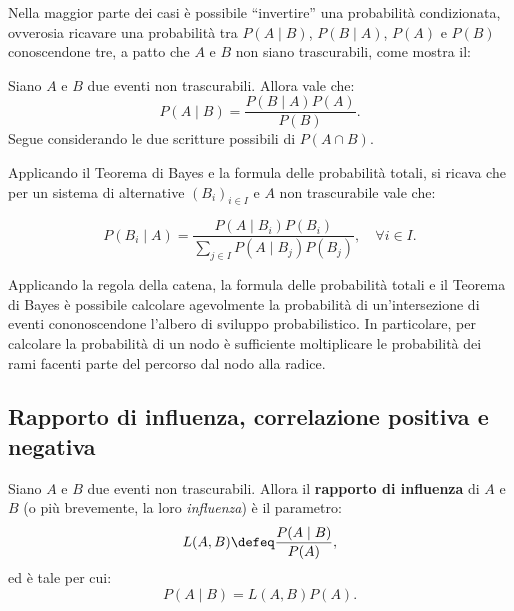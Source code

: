 \begin{multicols*}{2}
    Nella maggior parte dei casi è possibile ``invertire'' una probabilità
    condizionata, ovverosia ricavare una probabilità tra $P(A \mid B)$,
    $P(B \mid A)$, $P(A)$ e $P(B)$ conoscendone tre, a patto che
    $A$ e $B$ non siano trascurabili, come mostra il:

    \begin{theorem}[di Bayes]
        Siano $A$ e $B$ due eventi non trascurabili. Allora vale che:
        \[
            P(A \mid B) = \frac{P(B \mid A) P(A)}{P(B)}.
        \]
        Segue considerando le due scritture possibili di $P(A \cap B)$.
    \end{theorem}

    \begin{remark}
        Applicando il Teorema di Bayes e la formula delle probabilità totali,
        si ricava che per un sistema di alternative $(B_i)_{i \in I}$ e
        $A$ non trascurabile vale che:

        \[
            P(B_i \mid A) = \frac{P(A \mid B_i) P(B_i)}{\sum_{j \in I} P(A \mid B_j) P(B_j)}, \quad \forall i \in I.
        \]
    \end{remark}

    \begin{remark}
        Applicando la regola della catena, la formula delle probabilità totali
        e il Teorema di Bayes è possibile calcolare agevolmente la probabilità
        di un'intersezione di eventi cononoscendone l'albero di sviluppo probabilistico.
        In particolare, per calcolare la probabilità di un nodo è sufficiente
        moltiplicare le probabilità dei rami facenti parte del percorso dal nodo
        alla radice.
    \end{remark}

    \subsection{Rapporto di influenza, correlazione positiva e negativa}

    \begin{definition}
        Siano $A$ e $B$ due eventi non trascurabili. Allora
        il \textbf{rapporto di influenza} di $A$ e $B$
        (o più brevemente, la loro \textit{influenza}) è
        il parametro:
        \[
            L(A, B) \defeq \frac{P(A\mid B)}{P(A)},
        \]
        ed è tale per cui:
        \[
            P(A \mid B) = L(A, B) P(A).
        \]
    \end{definition}


\end{multicols*}
